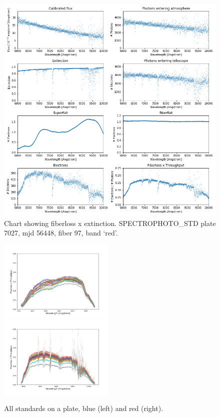 \begin{figure}[h]
\centering
\includegraphics[width=14cm]{images/specsim/fiberloss_chart_red.png}
\caption{Chart showing fiberloss x extinction. SPECTROPHOTO\_STD plate 7027, mjd 56448, fiber 97, band `red'.}
\label{fig:fiberloss_chart}
\end{figure}

\begin{figure}[h]
    \centering
    \includegraphics[width=0.495\textwidth]{images/specsim/all_standards_7027_56448_blue.png}
    \includegraphics[width=0.495\textwidth]{images/specsim/all_standards_7027_56448_red.png}
    \caption{All standards on a plate, blue (left) and red (right).}
    \label{fig:all_stds}
\end{figure}

